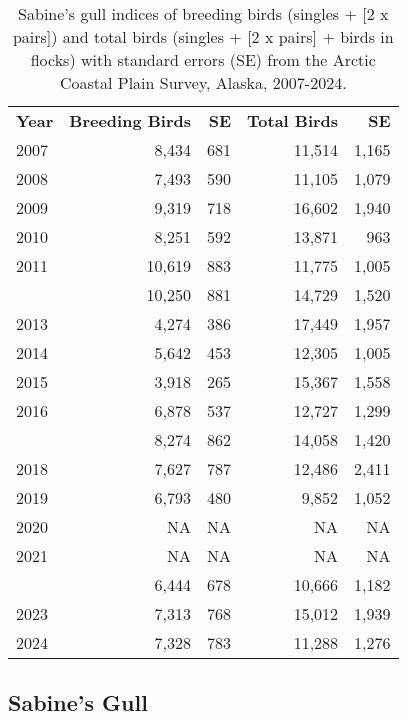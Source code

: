 \documentclass[
]{article}
\begin{document}
\begin{longtable}[t]{lrrrr}

\caption{\label{tbl-SAGU}Sabine's gull indices of breeding birds
(singles + {[}2 x pairs{]}) and total birds (singles + {[}2 x pairs{]} +
birds in flocks) with standard errors (SE) from the Arctic Coastal Plain
Survey, Alaska, 2007-2024.}

\tabularnewline

\\
\toprule
\textbf{Year} & \textbf{Breeding Birds} & \textbf{SE} & \textbf{Total Birds} & \textbf{SE}\\
\midrule
2007 & 8,434 & 681 & 11,514 & 1,165\\
2008 & 7,493 & 590 & 11,105 & 1,079\\
2009 & 9,319 & 718 & 16,602 & 1,940\\
2010 & 8,251 & 592 & 13,871 & 963\\
2011 & 10,619 & 883 & 11,775 & 1,005\\
\addlinespace
2012 & 10,250 & 881 & 14,729 & 1,520\\
2013 & 4,274 & 386 & 17,449 & 1,957\\
2014 & 5,642 & 453 & 12,305 & 1,005\\
2015 & 3,918 & 265 & 15,367 & 1,558\\
2016 & 6,878 & 537 & 12,727 & 1,299\\
\addlinespace
2017 & 8,274 & 862 & 14,058 & 1,420\\
2018 & 7,627 & 787 & 12,486 & 2,411\\
2019 & 6,793 & 480 & 9,852 & 1,052\\
2020 & NA & NA & NA & NA\\
2021 & NA & NA & NA & NA\\
\addlinespace
2022 & 6,444 & 678 & 10,666 & 1,182\\
2023 & 7,313 & 768 & 15,012 & 1,939\\
2024 & 7,328 & 783 & 11,288 & 1,276\\
\bottomrule

\end{longtable}

\endgroup{}

\newpage{}

\subsection*{Sabine's Gull}\label{sabines-gull-2}
\end{document}
